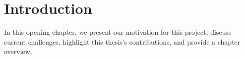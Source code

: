 \chapter{Introduction}
\label{chap:introduction}

In this opening chapter, we present our motivation for this project, discuss current challenges, highlight this thesis's contributions, and provide a chapter overview.


%


